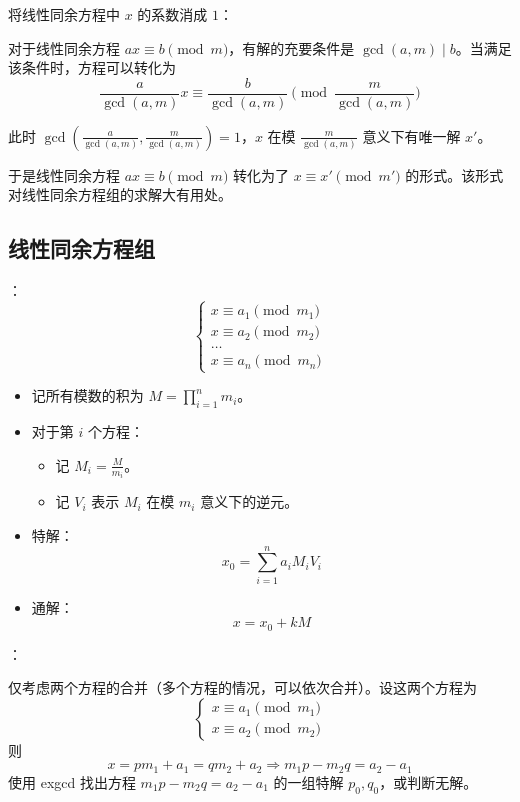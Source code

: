\begin{quoteblock}
将线性同余方程中 $x$ 的系数消成 $1$：

对于线性同余方程 $ax \equiv b \pmod m$，有解的充要条件是 $\gcd(a, m) \mid b$。当满足该条件时，方程可以转化为
\[
\frac{a}{\gcd(a, m)}x \equiv \frac{b}{\gcd(a, m)} \pmod{\frac{m}{\gcd(a, m)}}
\]

此时 $\gcd\left( \frac{a}{\gcd(a, m)}, \frac{m}{\gcd(a, m)} \right) = 1$，$x$ 在模 $\frac{m}{\gcd(a, m)}$ 意义下有唯一解 $x'$。

于是线性同余方程 $ax \equiv b \pmod m$ 转化为了 $x \equiv x' \pmod{m'}$ 的形式。该形式对线性同余方程组的求解大有用处。
\end{quoteblock}

\subsection{线性同余方程组}

：
\[
\begin{cases}
x \equiv a_1 \pmod{m_1} \\
x \equiv a_2 \pmod{m_2} \\
\dots \\
x \equiv a_n \pmod{m_n}
\end{cases}
\]

\begin{itemize}
    \item 记所有模数的积为 $M = \prod_{i = 1}^n m_i$。
    \item 对于第 $i$ 个方程：
    \begin{itemize}
        \item 记 $M_i = \frac{M}{m_i}$。
        \item 记 $V_i$ 表示 $M_i$ 在模 $m_i$ 意义下的逆元。
    \end{itemize}
    \item 特解：
    \[
    x_0 = \sum_{i = 1}^n a_iM_iV_i
    \]

    \item 通解：
    \[
    x = x_0 + kM
    \]
\end{itemize}


：

仅考虑两个方程的合并（多个方程的情况，可以依次合并）。设这两个方程为
\[
\begin{cases}
x \equiv a_1 \pmod{m_1} \\
x \equiv a_2 \pmod{m_2}
\end{cases}
\]
则
\[
x = pm_1 + a_1 = qm_2 + a_2 \Longrightarrow m_1p - m_2q = a_2 - a_1
\]
使用 exgcd 找出方程 $m_1p - m_2q = a_2 - a_1$ 的一组特解 $p_0, q_0$，或判断无解。

